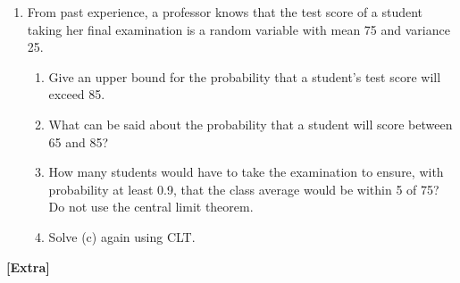 \documentclass[12pt]{article}%
\newcommand{\0}{{\bf 0}}
\begin{document}
\begin{enumerate}
\item
From past experience, a professor knows that the test score of a student taking her final examination is a random variable with mean 75 and variance 25.
\begin{enumerate}
\item
Give an upper bound for the probability that
a student's test score will exceed 85. 
\item
What can be said about the probability that a
student will score between 65 and 85?
\item
How many students would have to take the examination to ensure, with probability at least 0.9, that the class average would be within 5 of 75? Do not use the central limit
theorem.
\item
Solve (c) again using CLT.
\end{enumerate}
















\end{enumerate}


\begin{center}
{\Large\bf [Extra]} 
\end{center}
\end{document}
